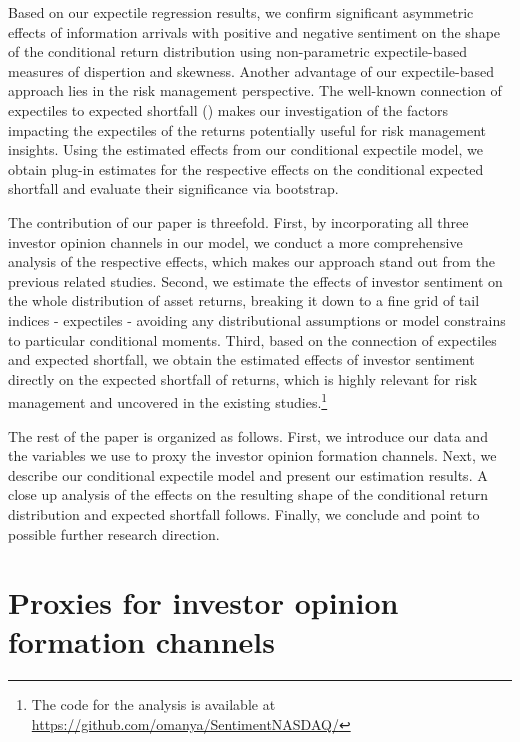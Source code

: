 \documentclass[11pt]{article}
\begin{document}
Based on our expectile regression results, we confirm significant asymmetric effects of information arrivals with positive and negative sentiment on the shape of the conditional return distribution using non-parametric expectile-based measures of dispertion and skewness. Another advantage of our expectile-based approach lies in the risk management perspective. The well-known connection of expectiles to expected shortfall (\cite{Taylor2008}) makes our investigation of the factors impacting the expectiles of the returns potentially useful for risk management insights. Using the estimated effects from our conditional expectile model, we obtain plug-in estimates for the respective effects on the conditional expected shortfall and evaluate their significance via bootstrap.

The contribution of our paper is threefold. First, by incorporating all three investor opinion channels in our model, we  conduct a more comprehensive analysis of the respective effects, which makes our approach stand out from the previous related studies. Second, we estimate the effects of investor sentiment on the whole distribution of asset returns, breaking it down to a fine grid of tail indices - expectiles - avoiding any distributional assumptions or model constrains to particular conditional moments. Third, based on the connection of expectiles and expected shortfall, we obtain the estimated effects of investor sentiment directly on the expected shortfall of returns, which is highly relevant for risk management and uncovered in the existing studies.\footnote{The code for the analysis is available at \href{https://github.com/omanya/SentimentNASDAQ/}{https://github.com/omanya/SentimentNASDAQ/}}

The rest of the paper is organized as follows. First, we introduce our data and the variables we use to proxy the investor opinion formation channels. Next, we describe our conditional expectile model and present our estimation results.  A close up analysis of the effects on the resulting shape of the conditional return distribution and expected shortfall follows. Finally, we conclude and point to possible further research direction.

\hypertarget{proxies-for-investor-opinion-channels}{%
\section{Proxies for investor opinion formation channels}\label{proxies-for-investor-opinion-channels}}
\end{document}
